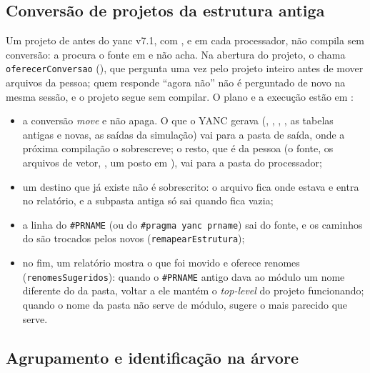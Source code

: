 \subsection{Conversão de projetos da estrutura antiga}
\label{sec:conversao-estrutura}

Um projeto de antes do yanc v7.1, com ,  e
 em cada processador, não compila sem conversão: a
 procura o fonte em  e não acha. Na abertura do
projeto, o  chama \lstinline|oferecerConversao|
(), que pergunta uma vez pelo projeto
inteiro antes de mover arquivos da pessoa; quem responde \enquote{agora não} não é
perguntado de novo na mesma sessão, e o projeto segue sem compilar. O plano e a
execução estão em :

\begin{itemize}[leftmargin=1.6em]
  \item a conversão \emph{move} e não apaga. O que o YANC gerava (,
    , , , as tabelas antigas e novas, as saídas
    da simulação) vai para a pasta de saída, onde a próxima compilação o
    sobrescreve; o resto, que é da pessoa (o fonte, os arquivos de vetor,
    , um  posto em ), vai para a pasta
    do processador;
  \item um destino que já existe não é sobrescrito: o arquivo fica onde estava e
    entra no relatório, e a subpasta antiga só sai quando fica vazia;
  \item a linha do \lstinline|#PRNAME| (ou do \lstinline|#pragma yanc prname|) sai
    do fonte, e os caminhos do  são trocados pelos novos
    (\lstinline|remapearEstrutura|);
  \item no fim, um relatório mostra o que foi movido e oferece renomes
    (\lstinline|renomesSugeridos|): quando o \lstinline|#PRNAME| antigo dava ao
    módulo um nome diferente do da pasta, voltar a ele mantém o \emph{top-level}
    do projeto funcionando; quando o nome da pasta não serve de módulo, sugere o
    mais parecido que serve.
\end{itemize}

\subsection{Agrupamento e identificação na árvore}

